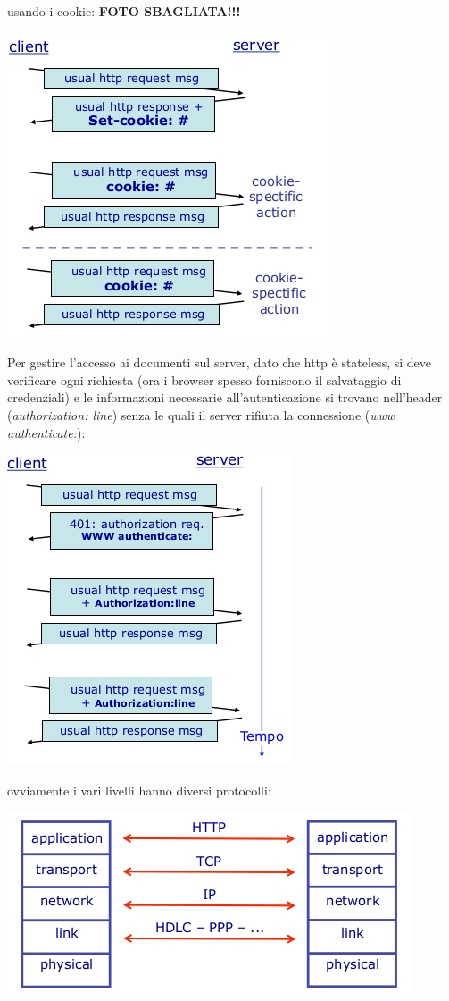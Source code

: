 \documentclass[a4paper,12pt, oneside]{book}
\begin{document}
usando i cookie:
\textbf{FOTO SBAGLIATA!!!}
\begin{center}
\includegraphics[scale=0.7]{img/http5.png}
\end{center}
Per gestire l'accesso ai documenti sul server, dato che http è stateless, si deve verificare ogni richiesta (ora i browser spesso forniscono il salvataggio di credenziali) e le informazioni necessarie all'autenticazione si trovano nell'header (\textit{authorization: line}) senza le quali il server rifiuta la connessione (\textit{www authenticate:}): 
\begin{center}
\includegraphics[scale=0.7]{img/http6.png}
\end{center}
ovviamente i vari livelli hanno diversi protocolli:
\begin{center}
\includegraphics[scale=0.7]{img/http7.png}
\end{center}
\end{document}
